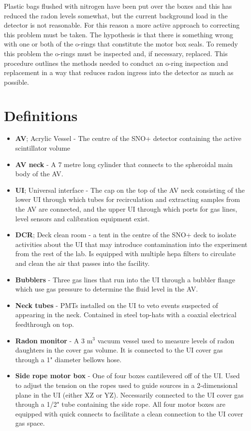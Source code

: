 \documentclass[11pt]{article}
\begin{document}
Plastic bags flushed with nitrogen have been put over the boxes and this has reduced the radon levels somewhat, but the current background load in the detector is not reasonable. For this reason a more active approach to correcting this problem must be taken. The hypothesis is that there is something wrong with one or both of the o-rings that constitute the motor box seals. To remedy this problem the o-rings must be inspected and, if necessary, replaced. This procedure outlines the methods needed to conduct an o-ring inspection and replacement in a way that reduces radon ingress into the detector as much as possible.

\section{Definitions}
\begin{itemize}
\item {\bf AV}; Acrylic Vessel - The centre of the SNO+ detector containing the active scintillator volume
\item {\bf AV neck} - A 7 metre long cylinder that connects to the spheroidal main body of the AV. 
\item {\bf UI}; Universal interface - The cap on the top of the AV neck consisting of the lower UI through which tubes for recirculation and extracting samples from the AV are connected, and the upper UI through which ports for gas lines, level sensors and calibration equipment exist. 
\item {\bf DCR}; Deck clean room - a tent in the centre of the SNO+ deck to isolate activities about the UI that may introduce contamination into the experiment from the rest of the lab. Is equipped with multiple hepa filters to circulate and clean the air that passes into the facility. 
\item {\bf Bubblers} - Three gas lines that run into the UI through a bubbler flange which use gas pressure to determine the fluid level in the AV. 
\item {\bf Neck tubes} - PMTs installed on the UI to veto events suspected of appearing in the neck. Contained in steel top-hats with a coaxial electrical feedthrough on top. 
\item {\bf Radon monitor} - A 3 m$^{3}$ vacuum vessel used to measure levels of radon daughters in the cover gas volume. It is connected to the UI cover gas through a 1" diameter bellows hose. 
\item {\bf Side rope motor box} - One of four boxes cantilevered off of the UI. Used to adjust the tension on the ropes used to guide sources in a 2-dimensional plane in the UI (either XZ or YZ). Necessarily connected to the UI cover gas through a 1/2" tube containing the side rope. All four motor boxes are equipped with quick connects to facilitate a clean connection to the UI cover gas space.

\end{itemize}
\end{document}
